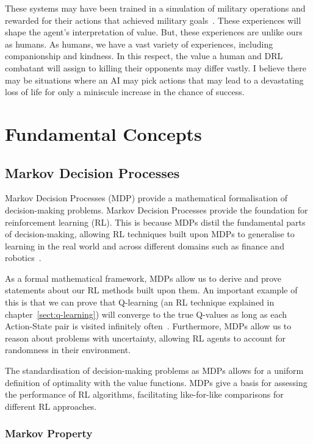 \documentclass[]{final_report}
\begin{document}
These systems may have been trained in a simulation of military operations and rewarded for their actions that achieved military goals~\cite{rlMilitaryReviewChina}. These experiences will shape the agent's interpretation of value. But, these experiences are unlike ours as humans. As humans, we have a vast variety of experiences, including companionship and kindness. In this respect, the value a human and DRL combatant will assign to killing their opponents may differ vastly. I believe there may be situations where an AI may pick actions that may lead to a devastating loss of life for only a miniscule increase in the chance of success. 

\chapter{Fundamental Concepts}
\label{chap:fundamental-concepts}
\section{Markov Decision Processes}

Markov Decision Processes (MDP) provide a mathematical formalisation of decision-making problems. Markov Decision Processes provide the foundation for reinforcement learning (RL). This is because MDPs distil the fundamental parts of decision-making, allowing RL techniques built upon MDPs to generalise to learning in the real world and across different domains such as finance and robotics~\cite{RLapplications}. 

As a formal mathematical framework, MDPs allow us to derive and prove statements about our RL methods built upon them. An important example of this is that we can prove that Q-learning (an RL technique explained in chapter~\ref{sect:q-learning}) will converge to the true Q-values as long as each Action-State pair is visited infinitely often~\cite{watkins1992q}. Furthermore, MDPs allow us to reason about problems with uncertainty, allowing RL agents to account for randomness in their environment. 

The standardisation of decision-making problems as MDPs allows for a uniform definition of optimality with the value functions. MDPs give a basis for assessing the performance of RL algorithms, facilitating like-for-like comparisons for different RL approaches. 


\subsection{Markov Property}
\end{document}
